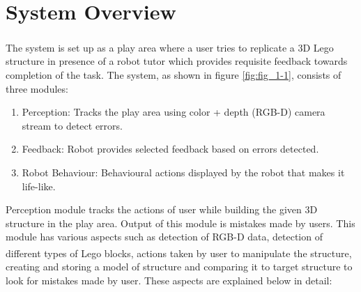 \chapter{System Overview}
\label{chap:three}
The system is set up as a play area where a user tries to replicate a 3D Lego\textsuperscript\textregistered{} structure in presence of a robot tutor which provides requisite feedback towards completion of the task. The system, as shown in figure \ref{fig:fig_1-1}, consists of three modules:
\begin{enumerate}
    \item Perception: Tracks the play area using color + depth (RGB-D) camera stream to detect errors.
    \item Feedback: Robot provides selected feedback based on errors detected. 
    \item Robot Behaviour: Behavioural actions displayed by the robot that makes it life-like. 
\end{enumerate}

Perception module tracks the actions of user while building the given 3D structure in the play area. Output of this module is mistakes made by users. This module has various aspects such as detection of RGB-D data, detection of different types of Lego\textsuperscript\textregistered{} blocks, actions taken by user to manipulate the structure, creating and storing a model of structure and comparing it to target structure to look for mistakes made by user. These aspects are explained below in detail:

